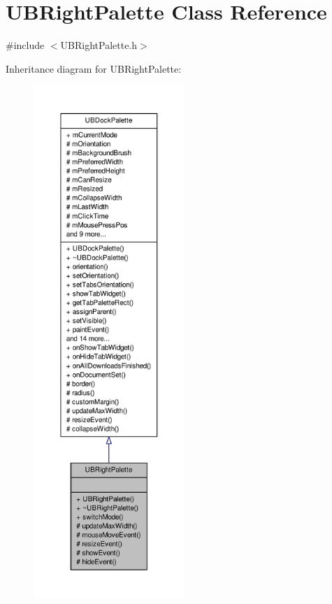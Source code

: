\hypertarget{class_u_b_right_palette}{\section{U\-B\-Right\-Palette Class Reference}
\label{d9/d48/class_u_b_right_palette}
}


{\ttfamily \#include $<$U\-B\-Right\-Palette.\-h$>$}



Inheritance diagram for U\-B\-Right\-Palette\-:
\nopagebreak
\begin{figure}[H]
\begin{center}
\leavevmode
\includegraphics[height=550pt]{d1/d20/class_u_b_right_palette__inherit__graph}
\end{center}
\end{figure}


